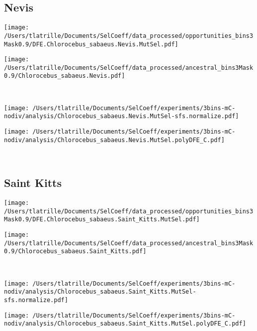 \documentclass{article}
\begin{document}
    \subsection{Nevis}

    \begin{minipage}{0.49\linewidth}
        \texttt{[image: /Users/tlatrille/Documents/SelCoeff/data\_processed/opportunities\_bins3Mask0.9/DFE.Chlorocebus\_sabaeus.Nevis.MutSel.pdf]}
    \end{minipage}
    \begin{minipage}{0.49\linewidth}
        \texttt{[image: /Users/tlatrille/Documents/SelCoeff/data\_processed/ancestral\_bins3Mask0.9/Chlorocebus\_sabaeus.Nevis.pdf]}
    \end{minipage}
    \\
    \begin{minipage}{0.49\linewidth}
        \texttt{[image: /Users/tlatrille/Documents/SelCoeff/experiments/3bins-mC-nodiv/analysis/Chlorocebus\_sabaeus.Nevis.MutSel-sfs.normalize.pdf]}
    \end{minipage}
    \begin{minipage}{0.49\linewidth}
        \texttt{[image: /Users/tlatrille/Documents/SelCoeff/experiments/3bins-mC-nodiv/analysis/Chlorocebus\_sabaeus.Nevis.MutSel.polyDFE\_C.pdf]}
    \end{minipage}
    \\
    \subsection{Saint Kitts}

    \begin{minipage}{0.49\linewidth}
        \texttt{[image: /Users/tlatrille/Documents/SelCoeff/data\_processed/opportunities\_bins3Mask0.9/DFE.Chlorocebus\_sabaeus.Saint\_Kitts.MutSel.pdf]}
    \end{minipage}
    \begin{minipage}{0.49\linewidth}
        \texttt{[image: /Users/tlatrille/Documents/SelCoeff/data\_processed/ancestral\_bins3Mask0.9/Chlorocebus\_sabaeus.Saint\_Kitts.pdf]}
    \end{minipage}
    \\
    \begin{minipage}{0.49\linewidth}
        \texttt{[image: /Users/tlatrille/Documents/SelCoeff/experiments/3bins-mC-nodiv/analysis/Chlorocebus\_sabaeus.Saint\_Kitts.MutSel-sfs.normalize.pdf]}
    \end{minipage}
    \begin{minipage}{0.49\linewidth}
        \texttt{[image: /Users/tlatrille/Documents/SelCoeff/experiments/3bins-mC-nodiv/analysis/Chlorocebus\_sabaeus.Saint\_Kitts.MutSel.polyDFE\_C.pdf]}
    \end{minipage}
    \\
\end{document}
